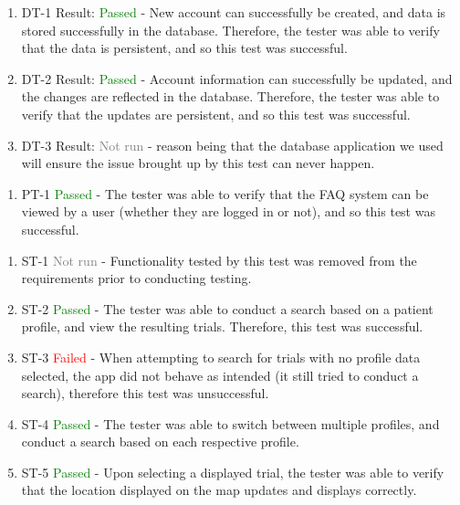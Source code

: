 \documentclass[12pt, titlepage]{article}
\begin{document}
\begin{enumerate}
  \item DT-1
  Result: \textcolor{green}{Passed} - New account can successfully be created, and data is stored successfully in the database. Therefore, the tester was able to verify that the data is 
  persistent, and so this test was successful.
  \item DT-2
  Result: \textcolor{green}{Passed} - Account information can successfully be updated, and the changes are reflected in the database. Therefore, the tester was able to verify
  that the updates are persistent, and so this test was successful.
  \item DT-3
  Result: \textcolor{gray}{Not run} - reason being that the database application we used will ensure the issue brought up by this test can never happen.\\
\end{enumerate}


\normalsize

\begin{enumerate}
  \item PT-1 \textcolor{green}{Passed} - The tester was able to verify that the FAQ system can be viewed by a user (whether they are logged in or not), and so this test was successful.\\
\end{enumerate}


\normalsize

\begin{enumerate}
  \item ST-1 \textcolor{gray}{Not run} - Functionality tested by this test was removed from the requirements prior to conducting testing.
  \item ST-2 \textcolor{green}{Passed} - The tester was able to conduct a search based on a patient profile, and view the resulting trials. Therefore, this test was 
  successful.
  \item ST-3 \textcolor{red}{Failed} - When attempting to search for trials with no profile data selected, the app did not behave as intended (it
  still tried to conduct a search), therefore this test was unsuccessful.
  \item ST-4 \textcolor{green}{Passed} - The tester was able to switch between multiple profiles, and conduct a search based on each respective profile.
  \item ST-5 \textcolor{green}{Passed} - Upon selecting a displayed trial, the tester was able to verify that the location displayed on the map updates and displays correctly.\\

\end{enumerate}
\end{document}
